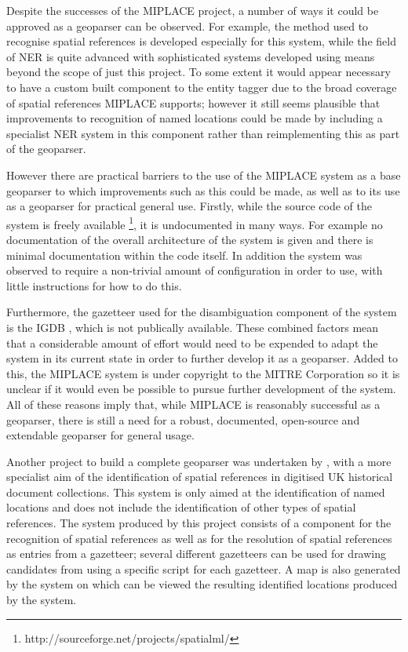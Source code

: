 \documentclass[12pt, a4paper]{report}
\begin{document}
Despite the successes of the MIPLACE project, a number of ways it could be approved as a geoparser can be observed. For example, the method used to recognise spatial references is developed especially for this system, while the field of NER is quite advanced with sophisticated systems developed using means beyond the scope of just this project. To some extent it would appear necessary to have a custom built component to the entity tagger due to the broad coverage of spatial references MIPLACE supports; however it still seems plausible that improvements to recognition of named locations could be made by including a specialist NER system in this component rather than reimplementing this as part of the geoparser.

However there are practical barriers to the use of the MIPLACE system as a base geoparser to which improvements such as this could be made, as well as to its use as a geoparser for practical general use. Firstly, while the source code of the system is freely available \footnote{http://sourceforge.net/projects/spatialml/}, it is undocumented in many ways. For example no documentation of the overall architecture of the system is given and there is minimal documentation within the code itself. In addition the system was observed to require a non-trivial amount of configuration in order to use, with little instructions for how to do this.

Furthermore, the gazetteer used for the disambiguation component of the system is the IGDB \citep{igdb2005}, which is not publically available. These combined factors mean that a considerable amount of effort would need to be expended to adapt the system in its current state in order to further develop it as a geoparser. Added to this, the MIPLACE system is under copyright to the MITRE Corporation so it is unclear if it would even be possible to pursue further development of the system. All of these reasons imply that, while MIPLACE is reasonably successful as a geoparser, there is still a need for a robust, documented, open-source and extendable geoparser for general usage.

Another project to build a complete geoparser was undertaken by \citet{tobin2010}, with a more specialist aim of the identification of spatial references in digitised UK historical document collections. This system is only aimed at the identification of named locations and does not include the identification of other types of spatial references. The system produced by this project consists of a component for the recognition of spatial references as well as for the resolution of spatial references as entries from a gazetteer; several different gazetteers can be used for drawing candidates from using a specific script for each gazetteer. A map is also generated by the system on which can be viewed the resulting identified locations produced by the system.
\end{document}
